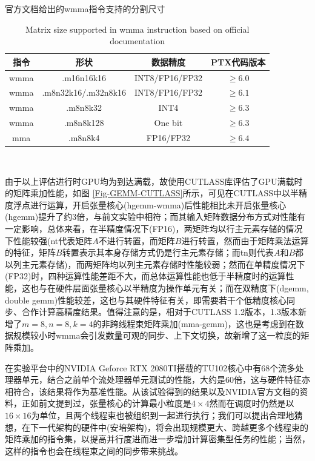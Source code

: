 \begin{table}
	\centering
	\renewcommand{\thetable}{\arabic{section}-\arabic{table} }
	\renewcommand{\tablename}{表}
	\caption{官方文档给出的wmma指令支持的分割尺寸\cite{PTX}}
	\addtocounter{table}{-1}
	\renewcommand{\thetable}{\arabic{section}-\arabic{table} }
	\renewcommand{\tablename}{Table}
	\caption{Matrix size supported in wmma instruction based on official documentation\cite{PTX}}
	\begin{tabular}{cccc}
		\toprule
		指令 & 形状 & 数据精度 & PTX代码版本 \\
		\midrule
		wmma & .m16n16k16 & INT8/FP16/FP32 & $ \geq 6.0 $\\ 
		wmma & .m8n32k16/.m32n8k16 & INT8/FP16/FP32 & $ \geq 6.1 $\\ 
		wmma & .m8n8k32 & INT4 & $ \geq 6.3 $\\ 
		wmma & .m8n8k128 & One bit & $ \geq 6.3 $\\ 
		mma & .m8n8k4 & FP16/FP32 & $ \geq 6.4 $\\ 
		\bottomrule
	\end{tabular} \label{table-WMMADOC} \\
	
\end{table}
\par 由于以上评估进行时GPU均为到达满载，故使用CUTLASS库评估了GPU满载时的矩阵乘加性能，如图 \ref{Fig-GEMM-CUTLASS}所示，可见在CUTLASS中以半精度浮点进行运算，开启张量核心(hgemm-wmma)后性能相比未开启张量核心(hgemm)提升了约3倍，与前文实验中相符；而其输入矩阵数据分布方式对性能有一定影响，总体来看，在半精度情况下(FP16)，两矩阵均以行主元素存储的情况下性能较强(nt代表矩阵$ A $不进行转置，而矩阵$ B $进行转置，然而由于矩阵乘法运算的特征，矩阵$ B $转置表示其本身存储方式仍是行主元素存储；而tn则代表$ A $和$ B $都以列主元素存储)，而两矩阵均以列主元素存储时性能较弱；然而在单精度情况下(FP32)时，四种运算性能差距不大，而总体运算性能也低于半精度时的运算性能，这也与在硬件层面张量核心以半精度为操作单元有关；而在双精度下(dgemm, double gemm)性能较差，这也与其硬件特征有关，即需要若干个低精度核心同步、合作计算高精度结果。值得注意的是，相对于CUTLASS 1.2版本，1.3版本新增了$ m=8,n=8,k=4 $的非跨线程束矩阵乘加(mma-gemm)，这也是考虑到在数据规模较小时wmma会引发数量可观的同步、上下文切换，故新增了这一粒度的矩阵乘加。
\par 在实验平台中的NVIDIA Geforce RTX 2080TI搭载的TU102核心中有68个流多处理器单元\cite{2080TI}，结合之前单个流处理器单元测试的性能，大约是60倍，这与硬件特征亦相符合，该结果将作为基准性能。从该试验得到的结果以及NVIDIA官方文档的资料，正如前文提到过，张量核心的计算最小粒度是$ 4\times 4 $然而在调度时仍然是以$ 16\times 16 $为单位，且两个线程束也被组织到一起进行执行；我们可以提出合理地猜想，在下一代架构的硬件中(安培架构)，将会出现规模更大、跨越更多个线程束的矩阵乘加的指令集，以提高并行度进而进一步增加计算密集型任务的性能；当然，这样的指令也会在线程束之间的同步带来挑战。

